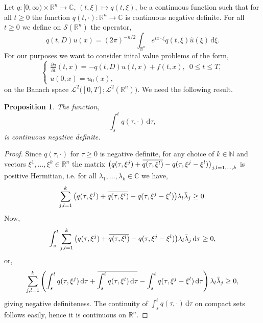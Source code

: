 \documentclass[a4paper, 12pt]{report}
\newtheorem{proposition}[theorem]{Proposition}
\theoremstyle{remark}
\theoremstyle{definition}
\newcommand{\overbar}[1]{\mkern 1.5mu\overline{\mkern-1.5mu#1\mkern-1.5mu}\mkern 1.5mu}
\begin{document}
Let $q : [0, \infty) \times \mathbb{R}^n \to \mathbb{C}$, $(t, \xi) \mapsto q(t, \xi)$, be a continuous function such that for all $t \ge 0$ the function $q(t, \cdot) : \mathbb{R}^n \to \mathbb{C}$ is continuous negative definite.  For all $t \ge 0$ we define on $\mathcal{S}(\mathbb{R}^n)$ the operator,
\begin{equation}
q(t, D)u(x) = (2\pi)^{-n/2}\int_{\mathbb{R}^n}e^{ix\cdot\xi}q(t, \xi)\hat{u}(\xi)\,\mathrm{d}\xi.
\end{equation}
For our purposes we want to consider inital value problems of the form,
\begin{equation}\label{IVPP}
\begin{cases}
\frac{\partial u}{\partial t}(t, x) = -q(t, D)u(t, x) + f(t, x), \,\,\, 0 \le t \le T,\\
u(0, x) = u_0(x),
\end{cases}
\end{equation}
on the Banach space $\mathcal{L}^2\big([0, T]; \mathcal{L}^2(\mathbb{R}^n)\big)$.  We need the following result.
\begin{proposition}\label{TDSFSP1}
The function,
$$
\int_s^tq(\tau, \cdot)\,\mathrm{d}\tau,
$$
is continuous negative definite.
\end{proposition}
\begin{proof}
Since $q(\tau, \cdot)$ for $\tau \ge 0$ is negative definite, for any choice of $k \in \mathbb{N}$ and vectors $\xi^1, \dots, \xi^k \in \mathbb{R}^n$ the matrix $\big(q(\tau, \xi^j) + \overbar{q(\tau, \xi^l)} - q(\tau, \xi^j - \xi^l)\big)_{j, l = 1, \dots, k}$ is positive Hermitian, i.e. for all $\lambda_1, \dots, \lambda_k \in \mathbb{C}$ we have,
$$
\sum_{j, l = 1}^k\big(q(\tau, \xi^j) + \overbar{q(\tau, \xi^l)} - q(\tau, \xi^j - \xi^l)\big)\lambda_l\bar{\lambda}_j \ge 0.
$$
Now,
$$
\int_s^t\sum_{j, l = 1}^k\big(q(\tau, \xi^j) + \overbar{q(\tau, \xi^l)} - q(\tau, \xi^j - \xi^l)\big)\lambda_l\bar{\lambda}_j\,\mathrm{d}\tau \ge 0,
$$
or,
$$
\sum_{j, l = 1}^k\left(\int_s^tq(\tau, \xi^j)\,\mathrm{d}\tau + \overbar{\int_s^tq(\tau, \xi^l)\,\mathrm{d}\tau} - \int_s^tq(\tau, \xi^j - \xi^l)\,\mathrm{d}\tau\right)\lambda_l\bar{\lambda}_j \ge 0,
$$
giving negative definiteness.  The continuity of $\int_s^tq(\tau, \cdot)\,\mathrm{d}\tau$ on compact sets follows easily, hence it is continuous on $\mathbb{R}^n$.
\end{proof}
\end{document}
